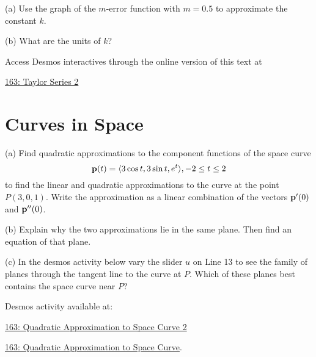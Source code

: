 \documentclass{ximera}
\begin{document}
\begin{question}  \label{Ertfgttree}
(a) Use the graph of the $m$-error function with $m=0.5$ to approximate the constant $k$.

(b) What are the units of $k$?
\end{question}



\begin{exploration}\label{Exp3:Comp}

 
\begin{onlineOnly}
    \begin{center}
\end{center}
\end{onlineOnly}

Access Desmos interactives through the online version of this text at
 
\href{https://www.desmos.com/calculator/oswisy36tn}{163: Taylor Series 2}


\end{exploration}





\section{Curves in Space}


\begin{question}  \label{Qgtyhtsry}
(a) Find quadratic approximations to the component functions of the space curve
\[
   {\bf p}(t) = \langle  3 \cos t, 3\sin t, e^t \rangle , -2\leq t \leq 2
\]
to find the linear and quadratic approximations to the curve at the point $P(3,0,1)$. Write the approximation as a linear combination of the vectors ${\bf p}^\prime(0)$ and ${\bf p}^{\prime\prime}(0)$.

(b) Explain why the two approximations lie in the same plane. Then find an equation of that plane.

(c) In the desmos activity below vary the slider $u$ on Line 13 to see the family of planes through the tangent line to the curve at $P$. Which of these planes best contains the space curve near $P$?

Desmos activity available at:

\href{https://www.desmos.com/3d/196e85fe1a}{163: Quadratic Approximation to Space Curve 2}


\href{https://www.desmos.com/3d/a263cd2883}{163: Quadratic Approximation to Space Curve}.

 

\end{question}
\end{document}
